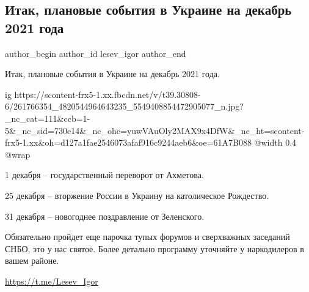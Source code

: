  
 
 
 
 
 
\subsection{Итак, плановые события в Украине на декабрь 2021 года}
\label{sec:27_11_2021.fb.lesev_igor.1.plan_dekjabrj_ukraina}
 
\ifcmt
 author_begin
   author_id lesev_igor
 author_end
\fi

Итак, плановые события в Украине на декабрь 2021 года.

\ifcmt
  ig https://scontent-frx5-1.xx.fbcdn.net/v/t39.30808-6/261766354_4820544964643235_5549408854472905077_n.jpg?_nc_cat=111&ccb=1-5&_nc_sid=730e14&_nc_ohc=yuwVAuOly2MAX9x4DfW&_nc_ht=scontent-frx5-1.xx&oh=d127a1fae2546073afaf916c9244aeb6&oe=61A7B088
  @width 0.4
  @wrap 
\fi

1 декабря – государственный переворот от Ахметова.

25 декабря – вторжение России в Украину на католическое Рождество.

31 декабря – новогоднее поздравление от Зеленского.

Обязательно пройдет еще парочка тупых форумов и сверхважных заседаний СНБО, это
у нас святое. Более детально программу уточняйте у наркодилеров в вашем районе.

\url{https://t.me/Lesev_Igor}

